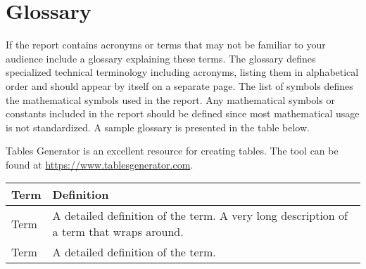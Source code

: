 \section*{Glossary}

If the report contains acronyms or terms that may not be familiar to your audience include a glossary explaining these terms. The glossary defines specialized technical terminology including acronyms, listing them in alphabetical order and should appear by itself on a separate page. The list of symbols defines the mathematical symbols used in the report. Any mathematical symbols or constants included in the report should be defined since most mathematical usage is not standardized. A sample glossary is presented in the table below.

Tables Generator is an excellent resource for creating tables. The tool can be found at \url{https://www.tablesgenerator.com}.

\vspace{0.25cm}

\begin{table}[h]
    \centering
    \begin{tabularx}{\textwidth}{l X}
        \toprule
        \textbf{\large{Term}}   &   \textbf{\large{Definition}}   \\
        \midrule
        Term                    &   A detailed definition of the term. A very long description of a term that wraps around. \\
        \midrule
        Term                    &   A detailed definition of the term. \\
        \bottomrule
    \end{tabularx}
\end{table}
